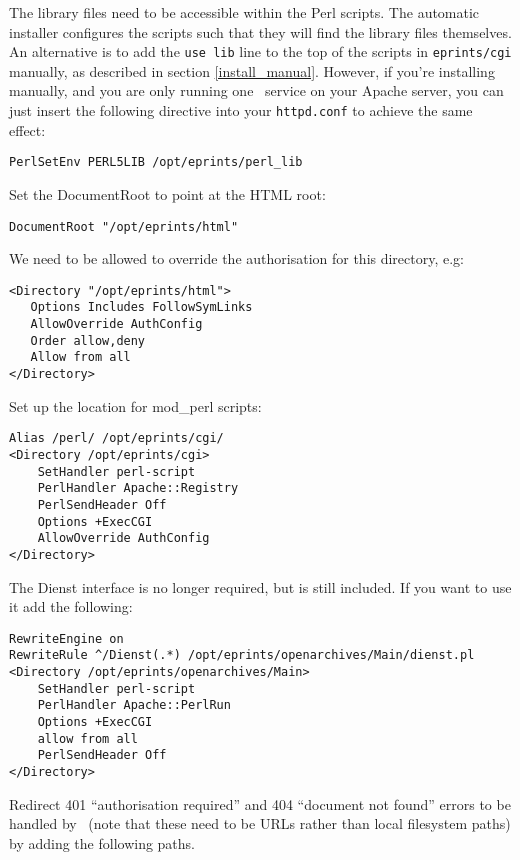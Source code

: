 The library files need to be accessible within the Perl scripts. The automatic installer configures the scripts such that they will find the library files themselves. An alternative is to add the {\tt use lib} line to the top of the scripts in {\tt eprints/cgi} manually, as described in section \ref{install_manual}. However, if you're installing manually, and you are only running one \eprints\ service on your Apache server, you can just insert the following directive into your {\tt httpd.conf} to achieve the same effect:

\begin{verbatim}
PerlSetEnv PERL5LIB /opt/eprints/perl_lib
\end{verbatim}

Set the DocumentRoot to point at the HTML root:

\begin{verbatim}
DocumentRoot "/opt/eprints/html"
\end{verbatim}

We need to be allowed to override the authorisation for this directory, e.g:

\begin{verbatim}
<Directory "/opt/eprints/html">
   Options Includes FollowSymLinks
   AllowOverride AuthConfig
   Order allow,deny
   Allow from all
</Directory>
\end{verbatim}

Set up the location for mod\_perl scripts:

\begin{verbatim}
Alias /perl/ /opt/eprints/cgi/
<Directory /opt/eprints/cgi>
    SetHandler perl-script
    PerlHandler Apache::Registry
    PerlSendHeader Off
    Options +ExecCGI
    AllowOverride AuthConfig
</Directory>
\end{verbatim}

The Dienst interface is no longer required, but is still included. If you want to use it add the following:

\begin{verbatim}
RewriteEngine on
RewriteRule ^/Dienst(.*) /opt/eprints/openarchives/Main/dienst.pl
<Directory /opt/eprints/openarchives/Main>
    SetHandler perl-script
    PerlHandler Apache::PerlRun
    Options +ExecCGI
    allow from all
    PerlSendHeader Off
</Directory>
\end{verbatim}

Redirect 401 ``authorisation required'' and 404 ``document not found'' errors to be handled by \eprints\ (note that these need to be URLs rather than local filesystem paths) by adding the following paths. 


